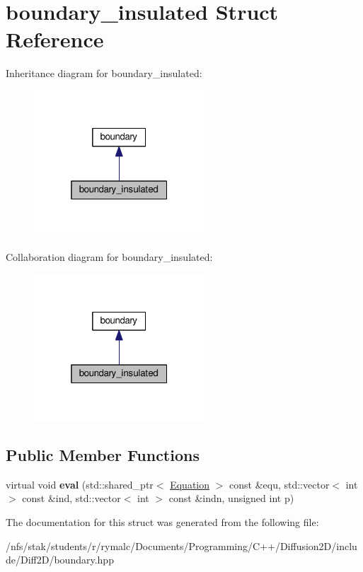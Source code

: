 \hypertarget{structboundary__insulated}{\section{boundary\+\_\+insulated Struct Reference}
\label{structboundary__insulated}
}


Inheritance diagram for boundary\+\_\+insulated\+:\nopagebreak
\begin{figure}[H]
\begin{center}
\leavevmode
\includegraphics[width=181pt]{structboundary__insulated__inherit__graph}
\end{center}
\end{figure}


Collaboration diagram for boundary\+\_\+insulated\+:\nopagebreak
\begin{figure}[H]
\begin{center}
\leavevmode
\includegraphics[width=181pt]{structboundary__insulated__coll__graph}
\end{center}
\end{figure}
\subsection*{Public Member Functions}
\begin{DoxyCompactItemize}
\item 
\hypertarget{structboundary__insulated_a738b5ea19e4dd105c312fdf33806ff5f}{virtual void {\bfseries eval} (std\+::shared\+\_\+ptr$<$ \hyperlink{classEquation}{Equation} $>$ const \&equ, std\+::vector$<$ int $>$ const \&ind, std\+::vector$<$ int $>$ const \&indn, unsigned int p)}\label{structboundary__insulated_a738b5ea19e4dd105c312fdf33806ff5f}

\end{DoxyCompactItemize}


The documentation for this struct was generated from the following file\+:\begin{DoxyCompactItemize}
\item 
/nfs/stak/students/r/rymalc/\+Documents/\+Programming/\+C++/\+Diffusion2\+D/include/\+Diff2\+D/boundary.\+hpp\end{DoxyCompactItemize}
